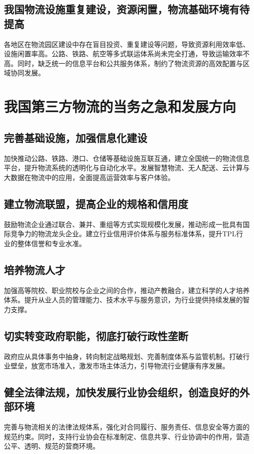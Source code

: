 \documentclass[UTF-8]{CUFEpaper}
\begin{document}
\subsection{我国物流设施重复建设，资源闲置，物流基础环境有待提高}
各地区在物流园区建设中存在盲目投资、重复建设等问题，导致资源利用效率低、设施闲置率高。公路、铁路、航空等多式联运体系尚未完全打通，导致运输效率不高。同时，缺乏统一的信息平台和公共服务体系，制约了物流资源的高效配置与区域协同发展。

\section{我国第三方物流的当务之急和发展方向}
\subsection{完善基础设施，加强信息化建设}
加快推动公路、铁路、港口、仓储等基础设施互联互通，建立全国统一的物流信息平台，提升物流系统的透明化与自动化水平。发展智慧物流、无人配送、云计算与大数据在物流中的应用，全面提高运营效率与客户体验。

\subsection{建立物流联盟，提高企业的规格和信用度}
鼓励物流企业通过联合、兼并、重组等方式实现规模化发展，推动形成一批具有国际竞争力的物流龙头企业。建立行业信用评价体系与服务标准体系，提升TPL行业的整体信誉和专业水准。

\subsection{培养物流人才}
加强高等院校、职业院校与企业之间的合作，推动产教融合，建立科学的人才培养体系。提升从业人员的管理能力、技术水平与服务意识，为行业提供持续发展的智力支撑。

\subsection{切实转变政府职能，彻底打破行政性垄断}
政府应从具体事务中抽身，转向制定战略规划、完善制度体系与监管机制。打破行业壁垒，放宽市场准入，激发市场主体活力，引导物流行业健康有序发展。

\subsection{健全法律法规，加快发展行业协会组织，创造良好的外部环境}
完善与物流相关的法律法规体系，强化对合同履行、服务责任、信息安全等方面的规范约束。同时，支持行业协会在标准制定、信息共享、行业协调中的作用，营造公平、透明、规范的营商环境。
\end{document}
